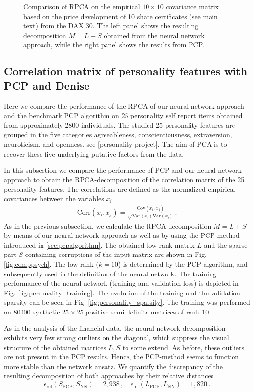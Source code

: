 \begin{figure}
	\caption{Comparison of RPCA on the empirical $10\times 10$ covariance matrix based on the price development of 10 share certificates (see main text) from the DAX 30. The left panel shows the resulting decomposition $M=L+S$ obtained from the neural network approach, while the right panel shows the results from PCP.}
	\label{fig:compfinance}
\end{figure}


\subsection{Correlation matrix of personality features with PCP and Denise}
Here we compare the performance of the RPCA of our neural network approach and the benchmark PCP algorithm on 25 personality self report items obtained from approximately 2800 individuals. The studied 25 personality features are grouped in the five categories agreeableness, conscientiousness, extraversion, neuroticism, and openness, see \href{https://www.personality-project.org/r/html/bfi.html}[personality-project]. The aim of PCA is to recover these five underlying putative factors from the data.

In this subsection we compare the performance of PCP and our neural network approach to obtain the RPCA-decomposition of the correlation matrix of the 25 personality features. The correlations are defined as the normalized empirical covariances between the variables $x_i$
\begin{align}
\text{Corr}(x_i,x_j) = \frac{\text{Cov}(x_i,x_j)}{\sqrt{\text{Var}(x_i) \text{Var}(x_i)}} \,.
\end{align}
As in the previous subsection, we calculate the RPCA-decomposition $M=L + S$ by means of our neural network approach as well as by using the PCP method introduced in \ref{sec:pcpalgorithm}. The obtained low rank matrix $L$ and the sparse part $S$ containing corruptions of the input matrix are shown in Fig. \ref{fig:comppsych}. The low-rank ($k=10$) is determined by the PCP-algorithm, and subsequently used in the definition of the neural network. The training performance of the neural network (training and validation loss) is depicted in Fig. \ref{fig:personality_training}. The evolution of the training and the validation sparsity can be seen in Fig. \ref{fig:personality_sparsity}. The training was performed on 80000 synthetic $25\times 25$ positive semi-definite matrices of rank $10$.

As in the analysis of the financial data, the neural network decomposition exhibits very few strong outliers on the diagonal, which suppress the visual structure of the obtained matrices $L,S$ to some extend. As before, these outliers are not present in the PCP results. Hence, the PCP-method seems to function more stable than the network ansatz. We quantify the discrepancy of the resulting decomposition of both approaches by their relative distances
\begin{equation}
\epsilon_\text{rel}(S_\text{PCP},S_\text{NN}) = 2,938 \,, \quad  \epsilon_\text{rel}(L_\text{PCP},L_\text{NN}) = 1,820 \,.
\end{equation}

